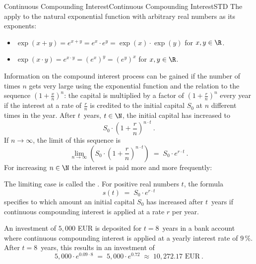 \begin{MXContent}{Continuous Compounding Interest}{Continuous Compounding Interest}{STD}
The  apply to the natural exponential function with arbitrary real 
numbers as its exponents:
\begin{itemize}
\item{$\exp(x+y)=e^{x+y}=e^{x}\cdot e^{y}=\exp (x)\cdot \exp (y)$ for $x,y\in\R$.}
\item{$\exp (x\cdot y)=e^{x\cdot y}=\left( e^{x} \right)^{y}= \left( e^{y} \right)^{x}$ for $x,y\in\R$.}
\end{itemize}

Information on the compound interest process can be gained if the number of times $n$ gets very large
using the exponential function and the relation to the sequence $(1+\frac{x}{n})^n$:
the capital is multiplied by a factor of $\left(1+\frac{r}{n} \right)^{n}$ every year if the interest at a rate of 
$\frac{r}{n}$ is credited to the initial capital $S_{0}$ at $n$ different times in the year. After $t$~years, 
$t\in\N$, the initial capital has increased to
$$
S_{0}\cdot \left({1+ \frac{r}{n}}\right)^{n\cdot t}\: .
$$
If $n\rightarrow \infty$, the limit of this sequence is
$$
\lim\limits_{n\rightarrow \infty} \left({S_{0}\cdot \left({1+\frac{r}{n}} \right)^{n\cdot t}}\right) \; =\; S_{0}\cdot e^{r\cdot t}\: .
$$
For increasing $n\in \N$ the interest is paid more and more frequently:

\begin{MInfo}
The limiting case is called the . 
For positive real numbers $t$, the formula
$$
s(t)\; =\; S_{0}\cdot e^{r\cdot t}
$$
specifies to which amount an initial capital $S_{0}$ has increased after $t$~years
if continuous compounding interest is applied at a rate $r$ per year.
\end{MInfo}

\begin{MExample}
An investment of $5{,}000$ EUR is deposited for $t=8$~years in a bank account where continuous compounding interest is applied 
at a yearly interest rate of $9\,\%$. After $t=8$~years, this results in an investment of
$$
5{,}000\cdot e^{0.09\cdot 8}\; =\; 5{,}000\cdot e^{0.72}\; \approx\; 10{,}272.17 \text{ EUR}\: .
$$
\end{MExample}

\end{MXContent}

